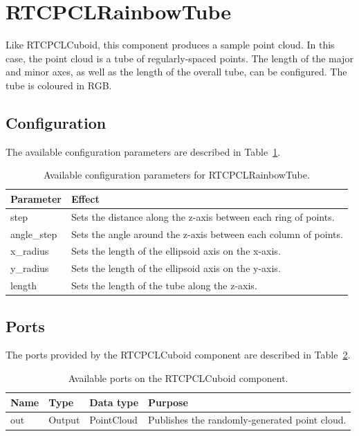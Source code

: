 \documentclass[a4paper,10pt]{article}
\begin{document}
\section{RTCPCLRainbowTube}
\label{sec:rtcpclrainbowtube}

Like RTCPCLCuboid, this component produces a sample point cloud. In this case, the point cloud is a tube of regularly-spaced points. The length of the major and minor axes, as well as the length of the overall tube, can be configured. The tube is coloured in RGB.

\subsection{Configuration}
\label{sec1:rainbowtube_configuration}

The available configuration parameters are described in
Table~\ref{tab:rainbowtube_config_params}.

\begin{table}[t]
  \centering
  \begin{tabularx}{\columnwidth}{lX}
    \toprule
    Parameter & Effect \\
    \midrule
    step & Sets the distance along the z-axis between each ring of points. \\
    angle\_step & Sets the angle around the z-axis between each column of points. \\
    x\_radius & Sets the length of the ellipsoid axis on the x-axis. \\
    y\_radius & Sets the length of the ellipsoid axis on the y-axis. \\
    length & Sets the length of the tube along the z-axis. \\
    \bottomrule
  \end{tabularx}
  \caption{Available configuration parameters for RTCPCLRainbowTube.}
  \label{tab:rainbowtube_config_params}
\end{table}

\subsection{Ports}
\label{sec1:cuboid_port}

The ports provided by the RTCPCLCuboid component are described in
Table~\ref{tab:cuboid_ports}.

\begin{table}[t]
  \centering
  \begin{tabularx}{\columnwidth}{lllX}
    \toprule
    Name & Type & Data type & Purpose \\
    \midrule
    out & Output & PointCloud & Publishes the randomly-generated point cloud. \\
    \bottomrule
  \end{tabularx}
  \caption{Available ports on the RTCPCLCuboid component.}
  \label{tab:cuboid_ports}
\end{table}
\end{document}
